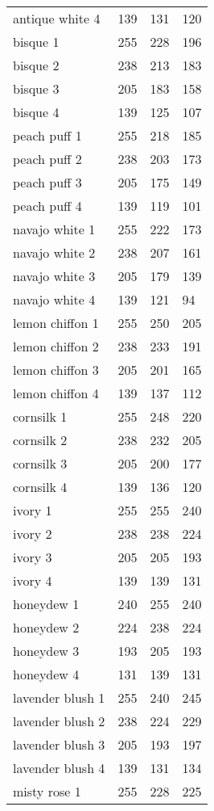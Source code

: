 \begin{center}
\begin{tabular}{llll}
  antique white 4 & 139 & 131 & 120  \\
  bisque 1 & 255 & 228 & 196  \\
  bisque 2 & 238 & 213 & 183  \\
  bisque 3 & 205 & 183 & 158  \\
  bisque 4 & 139 & 125 & 107  \\
  peach puff 1 & 255 & 218 & 185  \\
  peach puff 2 & 238 & 203 & 173  \\
  peach puff 3 & 205 & 175 & 149  \\
  peach puff 4 & 139 & 119 & 101  \\
  navajo white 1 & 255 & 222 & 173  \\
  navajo white 2 & 238 & 207 & 161  \\
  navajo white 3 & 205 & 179 & 139  \\
  navajo white 4 & 139 & 121 & 94  \\
  lemon chiffon 1 & 255 & 250 & 205  \\
  lemon chiffon 2 & 238 & 233 & 191  \\
  lemon chiffon 3 & 205 & 201 & 165  \\
  lemon chiffon 4 & 139 & 137 & 112  \\
  cornsilk 1 & 255 & 248 & 220  \\
  cornsilk 2 & 238 & 232 & 205  \\
  cornsilk 3 & 205 & 200 & 177  \\
  cornsilk 4 & 139 & 136 & 120  \\
  ivory 1 & 255 & 255 & 240  \\
  ivory 2 & 238 & 238 & 224  \\
  ivory 3 & 205 & 205 & 193  \\
  ivory 4 & 139 & 139 & 131  \\
  honeydew 1 & 240 & 255 & 240  \\
  honeydew 2 & 224 & 238 & 224  \\
  honeydew 3 & 193 & 205 & 193  \\
  honeydew 4 & 131 & 139 & 131  \\
  lavender blush 1 & 255 & 240 & 245  \\
  lavender blush 2 & 238 & 224 & 229  \\
  lavender blush 3 & 205 & 193 & 197  \\
  lavender blush 4 & 139 & 131 & 134  \\
  misty rose 1 & 255 & 228 & 225  \\

\end{tabular}
\end{center}
